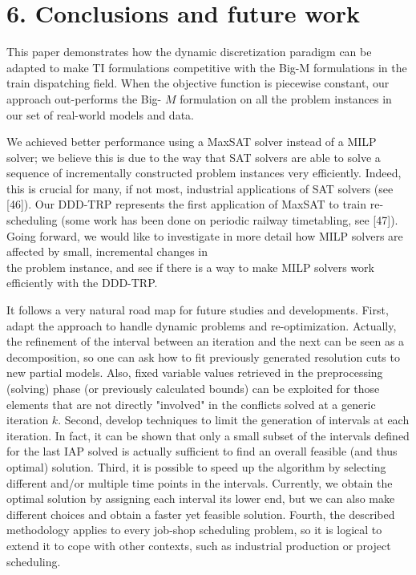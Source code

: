\documentclass[10pt]{article}
\begin{document}
\section*{6. Conclusions and future work}
This paper demonstrates how the dynamic discretization paradigm can be adapted to make TI formulations competitive with the Big-M formulations in the train dispatching field. When the objective function is piecewise constant, our approach out-performs the Big- $M$ formulation on all the problem instances in our set of real-world models and data.

We achieved better performance using a MaxSAT solver instead of a MILP solver; we believe this is due to the way that SAT solvers are able to solve a sequence of incrementally constructed problem instances very efficiently. Indeed, this is crucial for many, if not most, industrial applications of SAT solvers (see [46]). Our DDD-TRP represents the first application of MaxSAT to train re-scheduling (some work has been done on periodic railway timetabling, see [47]). Going forward, we would like to investigate in more detail how MILP solvers are affected by small, incremental changes in\\
the problem instance, and see if there is a way to make MILP solvers work efficiently with the DDD-TRP.

It follows a very natural road map for future studies and developments. First, adapt the approach to handle dynamic problems and re-optimization. Actually, the refinement of the interval between an iteration and the next can be seen as a decomposition, so one can ask how to fit previously generated resolution cuts to new partial models. Also, fixed variable values retrieved in the preprocessing (solving) phase (or previously calculated bounds) can be exploited for those elements that are not directly "involved" in the conflicts solved at a generic iteration $k$. Second, develop techniques to limit the generation of intervals at each iteration. In fact, it can be shown that only a small subset of the intervals defined for the last IAP solved is actually sufficient to find an overall feasible (and thus optimal) solution. Third, it is possible to speed up the algorithm by selecting different and/or multiple time points in the intervals. Currently, we obtain the optimal solution by assigning each interval its lower end, but we can also make different choices and obtain a faster yet feasible solution. Fourth, the described methodology applies to every job-shop scheduling problem, so it is logical to extend it to cope with other contexts, such as industrial production or project scheduling.
\end{document}

